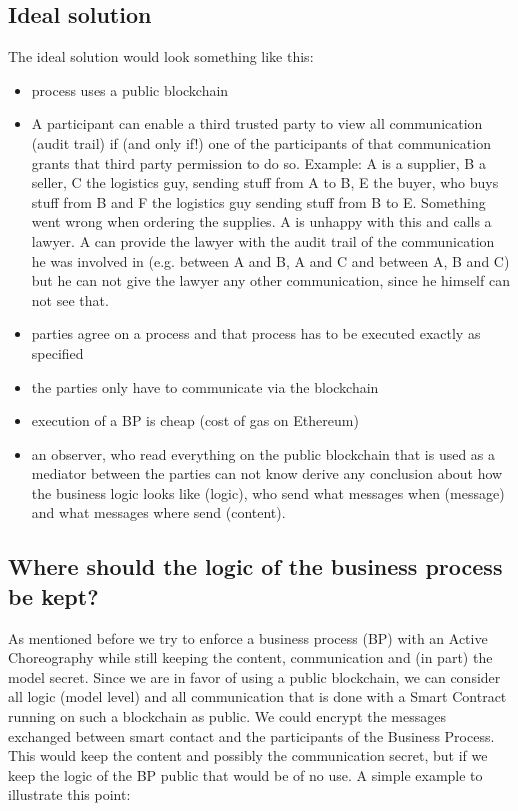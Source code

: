 \documentclass[runningheads]{llncs}
\begin{document}
\subsection{Ideal solution}
The ideal solution would look something like this: 
\begin{itemize}
    \item process uses a public blockchain
    \item A participant can enable a third trusted party to view all communication (audit trail) if (and only if!) one of the participants of that communication grants that third party permission to do so. Example: A is a supplier, B a seller, C the logistics guy, sending stuff from A to B, E the buyer, who buys stuff from B and F the logistics guy sending stuff from B to E. Something went wrong when ordering the supplies. A is unhappy with this and calls a lawyer. A can provide the lawyer with the audit trail of the communication he was involved in (e.g. between A and B, A and C and between A, B and C) but he can not give the lawyer any other communication, since he himself can not see that.
    \item parties agree on a process and that process has to be executed exactly as specified
    \item the parties only have to communicate via the blockchain
    \item execution of a BP is cheap (cost of gas on Ethereum)
    \item an observer, who read everything on the public blockchain that is used as a mediator between the parties can not know derive any conclusion about how the business logic looks like (logic), who send what messages when (message) and what messages where send (content).
\end{itemize}


\subsection{Where should the logic of the business process be kept?}

As mentioned before we try to enforce a business process (BP) with an Active Choreography while still keeping the content, communication and (in part) the model secret. Since we are in favor of using a public blockchain, we can consider all logic (model level) and all communication that is done with a Smart Contract running on such a blockchain as public. We could encrypt the messages exchanged between smart contact and the participants of the Business Process. This would keep the content and possibly the communication secret, but if we keep the logic of the BP public that would be of no use. A simple example to illustrate this point:
\end{document}
